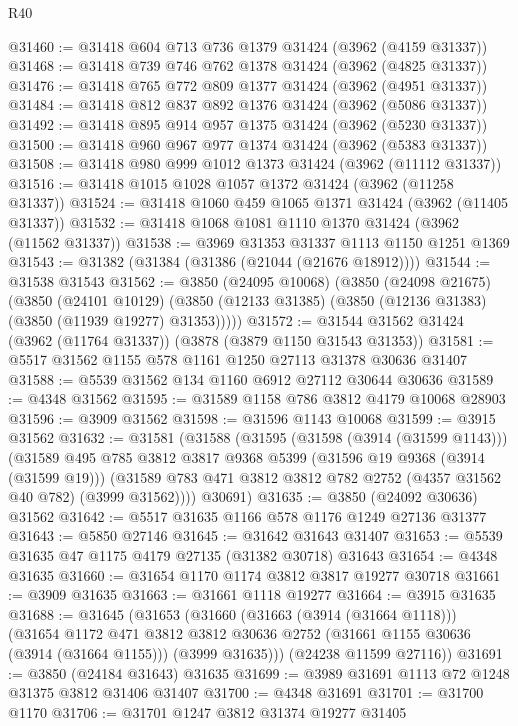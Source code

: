 \begin{lexlean}{R40}
\begin{coremodule}
@31460 := @31418 @604 @713 @736 @1379 @31424 (@3962 (@4159 @31337))
@31468 := @31418 @739 @746 @762 @1378 @31424 (@3962 (@4825 @31337))
@31476 := @31418 @765 @772 @809 @1377 @31424 (@3962 (@4951 @31337))
@31484 := @31418 @812 @837 @892 @1376 @31424 (@3962 (@5086 @31337))
@31492 := @31418 @895 @914 @957 @1375 @31424 (@3962 (@5230 @31337))
@31500 := @31418 @960 @967 @977 @1374 @31424 (@3962 (@5383 @31337))
@31508 := @31418 @980 @999 @1012 @1373 @31424 (@3962 (@11112 @31337))
@31516 := @31418 @1015 @1028 @1057 @1372 @31424 (@3962 (@11258 @31337))
@31524 := @31418 @1060 @459 @1065 @1371 @31424 (@3962 (@11405 @31337))
@31532 := @31418 @1068 @1081 @1110 @1370 @31424 (@3962 (@11562 @31337))
@31538 := @3969 @31353 @31337 @1113 @1150 @1251 @1369
@31543 := @31382 (@31384 (@31386 (@21044 (@21676 @18912))))
@31544 := @31538 @31543
@31562 := @3850
    (@24095 @10068)
    (@3850
      (@24098 @21675)
      (@3850
        (@24101 @10129)
        (@3850 (@12133 @31385) (@3850 (@12136 @31383) (@3850 (@11939 @19277) @31353)))))
@31572 := @31544 @31562 @31424 (@3962 (@11764 @31337)) (@3878 (@3879 @1150 @31543 @31353))
@31581 := @5517 @31562 @1155 @578 @1161 @1250 @27113 @31378 @30636 @31407
@31588 := @5539 @31562 @134 @1160 @6912 @27112 @30644 @30636
@31589 := @4348 @31562
@31595 := @31589 @1158 @786 @3812 @4179 @10068 @28903
@31596 := @3909 @31562
@31598 := @31596 @1143 @10068
@31599 := @3915 @31562
@31632 := @31581
    (@31588
      (@31595
        (@31598 (@3914 (@31599 @1143)))
        (@31589
          @495
          @785
          @3812
          @3817
          @9368
          @5399
          (@31596 @19 @9368 (@3914 (@31599 @19)))
          (@31589 @783 @471 @3812 @3812 @782 @2752 (@4357 @31562 @40 @782) (@3999 @31562))))
      @30691)
@31635 := @3850 (@24092 @30636) @31562
@31642 := @5517 @31635 @1166 @578 @1176 @1249 @27136 @31377
@31643 := @5850 @27146
@31645 := @31642 @31643 @31407
@31653 := @5539 @31635 @47 @1175 @4179 @27135 (@31382 @30718) @31643
@31654 := @4348 @31635
@31660 := @31654 @1170 @1174 @3812 @3817 @19277 @30718
@31661 := @3909 @31635
@31663 := @31661 @1118 @19277
@31664 := @3915 @31635
@31688 := @31645
    (@31653
      (@31660
        (@31663 (@3914 (@31664 @1118)))
        (@31654
          @1172
          @471
          @3812
          @3812
          @30636
          @2752
          (@31661 @1155 @30636 (@3914 (@31664 @1155)))
          (@3999 @31635)))
      (@24238 @11599 @27116))
@31691 := @3850 (@24184 @31643) @31635
@31699 := @3989 @31691 @1113 @72 @1248 @31375 @3812 @31406 @31407
@31700 := @4348 @31691
@31701 := @31700 @1170
@31706 := @31701 @1247 @3812 @31374 @19277 @31405

\end{coremodule}
\end{lexlean}
